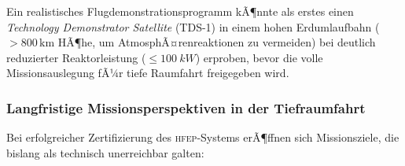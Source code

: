 ﻿\documentclass[a4paper,12pt,twoside]{article}
\theoremstyle{plain}
\theoremstyle{definition}
\theoremstyle{remark}
\newcommand{\HFEP}{\textsc{hfep}}
\begin{document}
	Ein realistisches Flugdemonstrationsprogramm kÃ¶nnte als erstes einen
	\emph{Technology Demonstrator Satellite} (TDS-1) in einem hohen Erdumlaufbahn
	($>800\,\mathrm{km}$ HÃ¶he, um AtmosphÃ¤renreaktionen zu vermeiden) bei deutlich
	reduzierter Reaktorleistung ($\leq\SI{100}{kW}$) erproben, bevor die volle
	Missionsauslegung fÃ¼r tiefe Raumfahrt freigegeben wird.

	\subsubsection{Langfristige Missionsperspektiven in der Tiefraumfahrt}

	Bei erfolgreicher Zertifizierung des \HFEP-Systems erÃ¶ffnen sich Missionsziele,
	die bislang als technisch unerreichbar galten:
\end{document}
